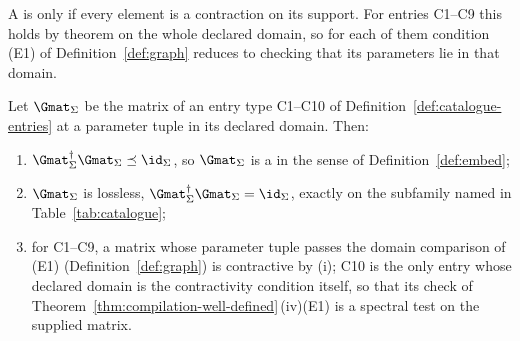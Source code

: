 
A  is  only if every element
is a contraction on its support. For entries C1--C9 this holds by theorem on
the whole declared domain, so for each of them condition (E1) of
Definition~\ref{def:graph} reduces to checking that its parameters lie in
that domain.

\begin{theorem}\label{thm:catalogue-admissibility}
Let $\Gmat_\Sigma$ be the matrix of an entry type C1--C10 of
Definition~\ref{def:catalogue-entries} at a parameter tuple in its declared
domain. Then:
\begin{enumerate}[label=(\roman*),leftmargin=2.2em]
\item $\Gmat_\Sigma^\dagger\Gmat_\Sigma\preceq\id_\Sigma$, so $\Gmat_\Sigma$
  is a  in the sense of Definition~\ref{def:embed};
\item $\Gmat_\Sigma$ is lossless,
  $\Gmat_\Sigma^\dagger\Gmat_\Sigma=\id_\Sigma$, exactly on the subfamily
  named in Table~\ref{tab:catalogue};
\item for C1--C9, a matrix whose parameter tuple passes the domain comparison
  of (E1) (Definition~\ref{def:graph}) is contractive by (i); C10 is the only
  entry whose declared domain is the contractivity condition itself, so that
  its check of Theorem~\ref{thm:compilation-well-defined}\,(iv)(E1) is a
  spectral test on the supplied matrix.
\end{enumerate}
\end{theorem}

